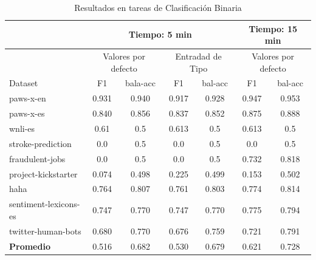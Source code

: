 \begin{table}
  \centering
  \resizebox{15cm}{!} {
  \begin{tabular}{|l|cccccc|}
  \hline
          & \multicolumn{4}{p{8cm}|}{Tiempo: 5 min}  & \multicolumn{2}{p{4cm}|}{Tiempo: 15 min}\\  \hline
          & \multicolumn{2}{p{4cm}|}{Valores por defecto} & \multicolumn{2}{p{4cm}|}{Entradad de Tipo} & \multicolumn{2}{p{4cm}|}{Valores por defecto}\\ \hline
  Dataset & F1 & bala-acc & F1  & bal-acc & F1 & bal-acc  \\ \hline
  paws-x-en             & 0.931 & 0.940 & 0.917 & 0.928 & 0.947 & 0.953 \\
  paws-x-es             & 0.840 & 0.856 & 0.837 & 0.852 & 0.875 & 0.888 \\
  wnli-es               & 0.61  & 0.5   & 0.613 & 0.5   & 0.613 & 0.5   \\ 
  stroke-prediction     & 0.0   & 0.5   & 0.0   & 0.5   & 0.0   & 0.5 \\
  fraudulent-jobs       & 0.0   & 0.5   & 0.0   & 0.5   & 0.732 & 0.818 \\
  project-kickstarter   & 0.074 & 0.498 & 0.225 & 0.499 & 0.153 & 0.502 \\
  haha                  & 0.764 & 0.807 & 0.761 & 0.803 & 0.774 & 0.814 \\
  sentiment-lexicons-es & 0.747 & 0.770 & 0.747 & 0.770 & 0.775 & 0.794 \\ 
  twitter-human-bots    & 0.680 & 0.770 & 0.676 & 0.759 & 0.721 & 0.791 \\ \hline
  \textbf{Promedio}     & 0.516 & 0.682 & 0.530 & 0.679 & 0.621 & 0.728 \\ \hline


  \end{tabular}
  \caption{Resultados en tareas de Clasificación Binaria}
  \label{fig:class-binary}
  }
\end{table}

